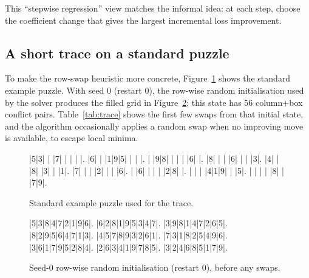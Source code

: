 \documentclass[11pt]{article}
\newcommand{\papersudokustyle}{%
    \setlength{\sudokusize}{6.2cm}%
    \setlength{\sudokuthinline}{0.8pt}%
    \setlength{\sudokuthickline}{2.8pt}%
    \renewcommand*\sudokuformat[1]{\Large\sffamily ##1}%
}
\begin{document}
This ``stepwise regression'' view matches the informal idea: at each step, choose the coefficient change that gives the largest incremental loss improvement.

\subsection{A short trace on a standard puzzle}
To make the row-swap heuristic more concrete, Figure~\ref{fig:example-puzzle} shows the standard example puzzle. With seed $0$ (restart $0$), the row-wise random initialisation used by the solver produces the filled grid in Figure~\ref{fig:seed-zero-init}; this state has $56$ column+box conflict pairs. Table~\ref{tab:trace} shows the first few swaps from that initial state, and the algorithm occasionally applies a random swap when no improving move is available, to escape local minima.

\begin{figure}[t]
\centering
{\papersudokustyle
\begin{sudoku-block}
|5|3| | |7| | | | |.
|6| | |1|9|5| | | |.
| |9|8| | | | |6| |.
|8| | | |6| | | |3|.
|4| | |8| |3| | |1|.
|7| | | |2| | | |6|.
| |6| | | | |2|8| |.
| | | |4|1|9| | |5|.
| | | | |8| | |7|9|.
\end{sudoku-block}}
\caption{Standard example puzzle used for the trace.}
\label{fig:example-puzzle}
\end{figure}

\begin{figure}[t]
\centering
{\papersudokustyle
\begin{sudoku-block}
|5|3|8|4|7|2|1|9|6|.
|6|2|8|1|9|5|3|4|7|.
|3|9|8|1|4|7|2|6|5|.
|8|2|9|5|6|4|7|1|3|.
|4|5|7|8|9|3|2|6|1|.
|7|3|1|8|2|5|4|9|6|.
|3|6|1|7|9|5|2|8|4|.
|2|6|3|4|1|9|7|8|5|.
|3|2|4|6|8|5|1|7|9|.
\end{sudoku-block}}
\caption{Seed-$0$ row-wise random initialisation (restart $0$), before any swaps.}
\label{fig:seed-zero-init}
\end{figure}
\end{document}
